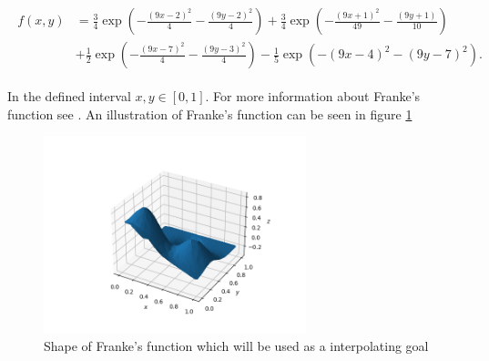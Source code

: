\documentclass[../main.tex]{subfiles}
\begin{document}
\begin{align}
\begin{split}
  f(x,y) &= \frac{3}{4}\exp{\left(-\frac{(9x-2)^2}{4} - \frac{(9y-2)^2}{4}\right)}+\frac{3}{4}\exp{\left(-\frac{(9x+1)^2}{49}- \frac{(9y+1)}{10}\right)} \\
  &+\frac{1}{2}\exp{\left(-\frac{(9x-7)^2}{4} - \frac{(9y-3)^2}{4}\right)} -\frac{1}{5}\exp{\left(-(9x-4)^2 - (9y-7)^2\right) }.
\end{split}
  \label{eq:franke-func}
\end{align}

In the defined interval $x,y\in[0,1]$. For more information about Franke's function see \cite{project1}. An illustration of Franke's function can be seen in figure \ref{fig:frankesplot}

\begin{figure}[H]
  \centering
  \includegraphics[trim=2.4cm 1cm 1.4cm 1cm, clip,width = 3in]{../assets/actual_franke_plot.png}
  \caption{Shape of Franke's function which will be used as a interpolating goal}
  \label{fig:frankesplot}
\end{figure}
\end{document}
